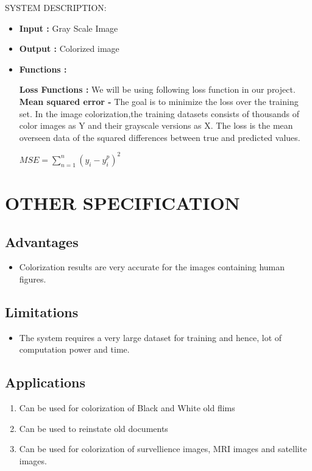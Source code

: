 \documentclass[12pt]{report}	%
\begin{document}
\label{sec:math}
SYSTEM DESCRIPTION:
\begin{itemize} 
\item {\bfseries Input :} Gray Scale Image	 
\item {\bfseries Output :} Colorized image
 
\item {\bfseries Functions :}

    

    {\bfseries Loss Functions :} 
    We will be using following loss function in our project.\\ 
    {\bfseries Mean squared error -} The goal is to minimize the loss over the training set. In the image colorization,the training datasets consists of thousands of color images as Y and their grayscale versions as X. The loss is the mean overseen data of the squared differences between true and predicted values.\\
    \begin{center}
            $MSE = \sum_{n=1}^{n} (y_i-y_i^p)^{2} $	
    \end{center}
	
\end{itemize}
\chapter{OTHER SPECIFICATION}
\section{Advantages}
\begin{itemize}
	\item Colorization results are very accurate for the images containing human figures.

\end{itemize}
\section{Limitations}
\begin{itemize}
	\item The system requires a very large dataset for training and hence, lot of computation power and time.
	
	
\end{itemize}
\section{Applications}
\begin{enumerate}
	\item Can be used for colorization of Black and White old flims
	\item Can be used to reinstate old documents
        \item Can be used for colorization of survellience images, MRI images and satellite images.
	
\end{enumerate}
\end{document}
